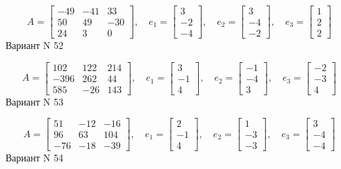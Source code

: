 \documentclass[11pt]{report}
\begin{document}
$$A = \left[\begin{matrix}-49 & -41 & 33\\50 & 49 & -30\\24 & 3 & 0\end{matrix}\right],\quad e_1 = \left[\begin{matrix}3\\-2\\-4\end{matrix}\right],\quad e_2 = \left[\begin{matrix}3\\-4\\-2\end{matrix}\right],\quad e_3 = \left[\begin{matrix}1\\2\\2\end{matrix}\right]$$Вариант N 52

$$A = \left[\begin{matrix}102 & 122 & 214\\-396 & 262 & 44\\585 & -26 & 143\end{matrix}\right],\quad e_1 = \left[\begin{matrix}3\\-1\\4\end{matrix}\right],\quad e_2 = \left[\begin{matrix}-1\\-4\\3\end{matrix}\right],\quad e_3 = \left[\begin{matrix}-2\\-3\\4\end{matrix}\right]$$Вариант N 53

$$A = \left[\begin{matrix}51 & -12 & -16\\96 & 63 & 104\\-76 & -18 & -39\end{matrix}\right],\quad e_1 = \left[\begin{matrix}2\\-1\\4\end{matrix}\right],\quad e_2 = \left[\begin{matrix}1\\-3\\-3\end{matrix}\right],\quad e_3 = \left[\begin{matrix}3\\-4\\-4\end{matrix}\right]$$Вариант N 54
\end{document}
